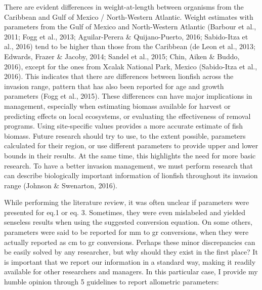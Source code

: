 \documentclass[12pt,]{article}
\begin{document}
There are evident differences in weight-at-length between organisms from
the Caribbean and Gulf of Mexico / North-Western Atlantic. Weight
estimates with parameters from the Gulf of Mexico and North-Western
Atlantic (Barbour et al., 2011; Fogg et al., 2013; Aguilar-Perera \&
Quijano-Puerto, 2016; Sabido-Itza et al., 2016) tend to be higher than
those from the Caribbean (de Leon et al., 2013; Edwards, Frazer \&
Jacoby, 2014; Sandel et al., 2015; Chin, Aiken \& Buddo, 2016), except
for the ones from Xcalak National Park, Mexico (Sabido-Itza et al.,
2016). This indicates that there are differences between lionfish across
the invasion range, pattern that has also been reported for age and
growth parameters (Fogg et al., 2015). These differences can have major
implications in management, especially when estimating biomass available
for harvest or predicting effects on local ecosystems, or evaluating the
effectiveness of removal programs. Using site-specific values provides a
more accurate estimate of fish biomass. Future research should try to
use, to the extent possible, parameters calculated for their region, or
use different parameters to provide upper and lower bounds in their
results. At the same time, this highlights the need for more basic
research. To have a better invasion management, we must perform research
that can describe biologically important information of lionfish
throughout its invasion range (Johnson \& Swenarton, 2016).

While performing the literature review, it was often unclear if
parameters were presented for eq.1 or eq. 3. Sometimes, they were even
mislabeled and yielded senseless results when using the suggested
conversion equation. On some others, parameters were said to be reported
for mm to gr conversions, when they were actually reported as cm to gr
conversions. Perhaps these minor discrepancies can be easily solved by
any researcher, but why should they exist in the first place? It is
important that we report our information in a standard way, making it
readily available for other researchers and managers. In this particular
case, I provide my humble opinion through 5 guidelines to report
allometric parameters:
\end{document}

